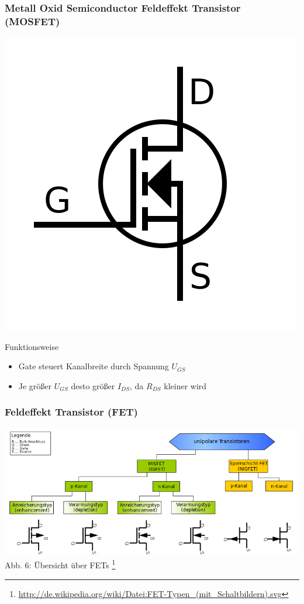 \begin{frame}
\frametitle{Metall Oxid Semiconductor Feldeffekt Transistor (MOSFET)}
\begin{center}
	\includegraphics[scale=0.2]{e13/N-Ch_Enh_Labelled.png}\\
\begin{block}{Funktionsweise}
\begin{itemize}
	\item Gate steuert Kanalbreite durch Spannung $U_{GS}$
	\item Je größer $U_{GS}$ desto größer $I_{DS}$, da $R_{DS}$ kleiner wird
\end{itemize}
\end{block}
\end{center}
\end{frame}

\begin{frame}
\frametitle{Feldeffekt Transistor (FET)}
\begin{center}
	\includegraphics[scale=0.35]{e13/FET-overview.png}\\
	Abb. 6: Übersicht über FETs
	\footnote{\url{http://de.wikipedia.org/wiki/Datei:FET-Typen_(mit_Schaltbildern).svg}}\\
\end{center}
\end{frame}

